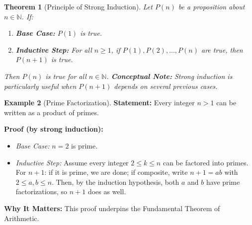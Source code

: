 \documentclass[12pt]{article}
\newtheorem{theorem}{Theorem}[section]
\theoremstyle{definition}
\newtheorem{example}[theorem]{Example}
\begin{document}
\begin{center}
\end{center}

\begin{theorem}[Principle of Strong Induction]
  Let \(P(n)\) be a proposition about \(n \in \mathbb{N}\). If:
  \begin{enumerate}[label=(\roman*)]
    \item \textbf{Base Case:} \(P(1)\) is true.
    \item \textbf{Inductive Step:} For all \(n \ge 1\), if \(P(1), P(2), \dots, P(n)\) are true, then \(P(n+1)\) is true.
  \end{enumerate}
  Then \(P(n)\) is true for all \(n \in \mathbb{N}\).
  \vspace{0.5em}
  \textbf{Conceptual Note:} Strong induction is particularly useful when \(P(n+1)\) depends on several previous cases.
\end{theorem}

\begin{example}[Prime Factorization]
  \textbf{Statement:} Every integer \(n > 1\) can be written as a product of primes.
  
  \textbf{Proof (by strong induction):}
  \begin{itemize}[itemsep=3pt]
    \item \emph{Base Case:} \(n = 2\) is prime.
    \item \emph{Inductive Step:} Assume every integer \(2 \le k \le n\) can be factored into primes. For \(n+1\): if it is prime, we are done; if composite, write \(n+1 = ab\) with \(2 \le a,b \le n\). Then, by the induction hypothesis, both \(a\) and \(b\) have prime factorizations, so \(n+1\) does as well.
  \end{itemize}
  \vspace{0.5em}
  \textbf{Why It Matters:} This proof underpins the Fundamental Theorem of Arithmetic.
\end{example}
\end{document}
